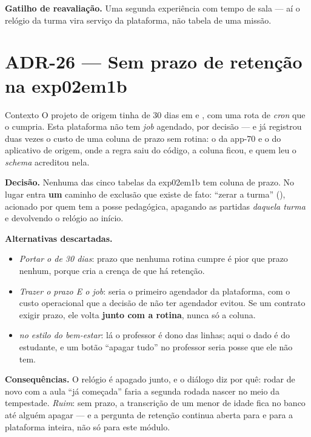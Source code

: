 \textbf{Gatilho de reavaliação.} Uma segunda experiência com tempo de sala ---
aí o relógio da turma vira serviço da plataforma, não tabela de uma missão.

\section{ADR-26 --- Sem prazo de retenção na exp02em1b}
\label{adr:retencao-exp02em1b}

\begin{especificacao}{Contexto}
O projeto de origem tinha  de 30 dias em  e
, com uma rota de \emph{cron} que o cumpria. Esta plataforma não tem
\emph{job} agendado, por decisão --- e já registrou duas vezes o custo de uma
coluna de prazo sem rotina: o  da app-70 e o
 do aplicativo de origem, onde a regra saiu do
código, a coluna ficou, e quem leu o \emph{schema} acreditou nela.
\end{especificacao}

\textbf{Decisão.} Nenhuma das cinco tabelas da exp02em1b tem coluna de prazo. No
lugar entra \textbf{um} caminho de exclusão que existe de fato: \enquote{zerar a
turma} (), acionado por quem tem
a posse pedagógica, apagando as partidas \emph{daquela turma} e devolvendo o
relógio ao início.

\textbf{Alternativas descartadas.}
\begin{itemize}
  \item \emph{Portar o  de 30 dias}: prazo que nenhuma rotina
    cumpre é pior que prazo nenhum, porque cria a crença de que há retenção.
  \item \emph{Trazer o prazo E o \emph{job}}: seria o primeiro agendador da
    plataforma, com o custo operacional que a decisão de não ter agendador
    evitou. Se um contrato exigir prazo, ele volta \textbf{junto com a rotina},
    nunca só a coluna.
  \item \emph{ no estilo do bem-estar}: lá o professor
    é dono das linhas; aqui o dado é do estudante, e um botão \enquote{apagar tudo} no
    professor seria posse que ele não tem.
\end{itemize}

\textbf{Consequências.} O relógio é apagado junto, e o diálogo diz por quê:
rodar de novo com a aula \enquote{já começada} faria a segunda rodada nascer no
meio da tempestade. \emph{Ruim}: sem prazo, a transcrição de um menor de idade
fica no banco até alguém apagar --- e a pergunta de retenção continua aberta para
 e para a plataforma inteira, não só para este módulo.

